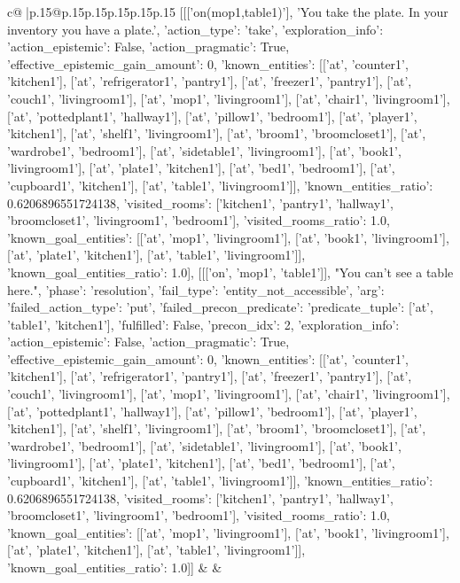 \documentclass{article}
\begin{document}
{\begin{supertabular}{c@{$\;$}|p{.15\linewidth}@{}p{.15\linewidth}p{.15\linewidth}p{.15\linewidth}p{.15\linewidth}p{.15\linewidth}}
{{{	 [[['on(mop1,table1)'], 'You take the plate. In your inventory you have a plate.', {'action_type': 'take', 'exploration_info': {'action_epistemic': False, 'action_pragmatic': True, 'effective_epistemic_gain_amount': 0, 'known_entities': [['at', 'counter1', 'kitchen1'], ['at', 'refrigerator1', 'pantry1'], ['at', 'freezer1', 'pantry1'], ['at', 'couch1', 'livingroom1'], ['at', 'mop1', 'livingroom1'], ['at', 'chair1', 'livingroom1'], ['at', 'pottedplant1', 'hallway1'], ['at', 'pillow1', 'bedroom1'], ['at', 'player1', 'kitchen1'], ['at', 'shelf1', 'livingroom1'], ['at', 'broom1', 'broomcloset1'], ['at', 'wardrobe1', 'bedroom1'], ['at', 'sidetable1', 'livingroom1'], ['at', 'book1', 'livingroom1'], ['at', 'plate1', 'kitchen1'], ['at', 'bed1', 'bedroom1'], ['at', 'cupboard1', 'kitchen1'], ['at', 'table1', 'livingroom1']], 'known_entities_ratio': 0.6206896551724138, 'visited_rooms': ['kitchen1', 'pantry1', 'hallway1', 'broomcloset1', 'livingroom1', 'bedroom1'], 'visited_rooms_ratio': 1.0, 'known_goal_entities': [['at', 'mop1', 'livingroom1'], ['at', 'book1', 'livingroom1'], ['at', 'plate1', 'kitchen1'], ['at', 'table1', 'livingroom1']], 'known_goal_entities_ratio': 1.0}}], [[['on', 'mop1', 'table1']], "You can't see a table here.", {'phase': 'resolution', 'fail_type': 'entity_not_accessible', 'arg': {'failed_action_type': 'put', 'failed_precon_predicate': {'predicate_tuple': ['at', 'table1', 'kitchen1'], 'fulfilled': False, 'precon_idx': 2}}, 'exploration_info': {'action_epistemic': False, 'action_pragmatic': True, 'effective_epistemic_gain_amount': 0, 'known_entities': [['at', 'counter1', 'kitchen1'], ['at', 'refrigerator1', 'pantry1'], ['at', 'freezer1', 'pantry1'], ['at', 'couch1', 'livingroom1'], ['at', 'mop1', 'livingroom1'], ['at', 'chair1', 'livingroom1'], ['at', 'pottedplant1', 'hallway1'], ['at', 'pillow1', 'bedroom1'], ['at', 'player1', 'kitchen1'], ['at', 'shelf1', 'livingroom1'], ['at', 'broom1', 'broomcloset1'], ['at', 'wardrobe1', 'bedroom1'], ['at', 'sidetable1', 'livingroom1'], ['at', 'book1', 'livingroom1'], ['at', 'plate1', 'kitchen1'], ['at', 'bed1', 'bedroom1'], ['at', 'cupboard1', 'kitchen1'], ['at', 'table1', 'livingroom1']], 'known_entities_ratio': 0.6206896551724138, 'visited_rooms': ['kitchen1', 'pantry1', 'hallway1', 'broomcloset1', 'livingroom1', 'bedroom1'], 'visited_rooms_ratio': 1.0, 'known_goal_entities': [['at', 'mop1', 'livingroom1'], ['at', 'book1', 'livingroom1'], ['at', 'plate1', 'kitchen1'], ['at', 'table1', 'livingroom1']], 'known_goal_entities_ratio': 1.0}}]] 
	  } 
	   } 
	   } 
	 & & \\ 
 


\end{supertabular}}
\end{document}
